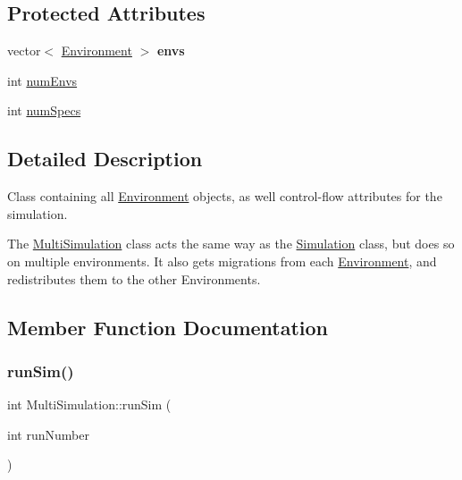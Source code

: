 \subsection*{Protected Attributes}
\begin{DoxyCompactItemize}
\item 
\hypertarget{classMultiSimulation_a1a63b241c79c535e6eca8708abd78ba9}{}\label{classMultiSimulation_a1a63b241c79c535e6eca8708abd78ba9} 
vector$<$ \hyperlink{classEnvironment}{Environment} $>$ {\bfseries envs}
\item 
int \hyperlink{classMultiSimulation_ac49cc927d6f96d4fda4ff010abc5041a}{num\+Envs}
\item 
int \hyperlink{classMultiSimulation_a383fa1e045cf0e1e7314708c89cb6312}{num\+Specs}
\end{DoxyCompactItemize}


\subsection{Detailed Description}
Class containing all \hyperlink{classEnvironment}{Environment} objects, as well control-\/flow attributes for the simulation. 

The \hyperlink{classMultiSimulation}{Multi\+Simulation} class acts the same way as the \hyperlink{classSimulation}{Simulation} class, but does so on multiple environments. It also gets migrations from each \hyperlink{classEnvironment}{Environment}, and redistributes them to the other Environments. 

\subsection{Member Function Documentation}
\hypertarget{classMultiSimulation_a235347d04fd0c7e1a2e35d7a39e77583}{}\label{classMultiSimulation_a235347d04fd0c7e1a2e35d7a39e77583} 
\subsubsection{\texorpdfstring{run\+Sim()}{runSim()}}
{\footnotesize\ttfamily int Multi\+Simulation\+::run\+Sim (\begin{DoxyParamCaption}\item[{int}]{run\+Number }\end{DoxyParamCaption})\hspace{0.3cm}{\ttfamily [virtual]}}




